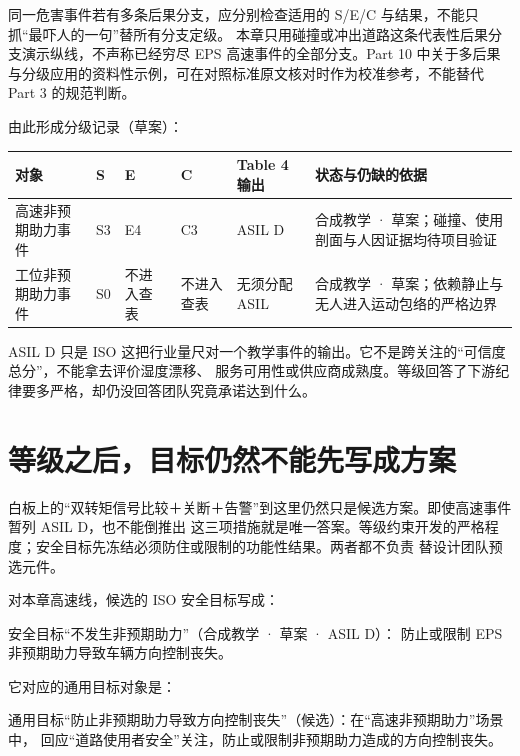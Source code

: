 同一危害事件若有多条后果分支，应分别检查适用的 S/E/C 与结果，不能只抓“最吓人的一句”替所有分支定级。
本章只用碰撞或冲出道路这条代表性后果分支演示纵线，不声称已经穷尽 EPS 高速事件的全部分支。Part 10 中关于多后果
与分级应用的资料性示例，可在对照标准原文核对时作为校准参考，不能替代 Part 3 的规范判断。

由此形成分级记录（草案）：

\begin{center}
\begingroup\small
\setlength{\tabcolsep}{4pt}
\begin{tabularx}{\linewidth}{@{}XXXXXX@{}}
\toprule
对象 & S & E & C & Table 4 输出 & 状态与仍缺的依据 \\
\midrule
高速非预期助力事件 & S3 & E4 & C3 & ASIL D & 合成教学 · 草案；碰撞、使用剖面与人因证据均待项目验证 \\
工位非预期助力事件 & S0 & 不进入查表 & 不进入查表 & 无须分配 ASIL & 合成教学 · 草案；依赖静止与无人进入运动包络的严格边界 \\
\bottomrule
\end{tabularx}
\endgroup
\end{center}

ASIL D 只是 ISO 这把行业量尺对一个教学事件的输出。它不是跨关注的“可信度总分”，不能拿去评价湿度漂移、
服务可用性或供应商成熟度。等级回答了下游纪律要多严格，却仍没回答团队究竟承诺达到什么。

\section{等级之后，目标仍然不能先写成方案}

白板上的“双转矩信号比较＋关断＋告警”到这里仍然只是候选方案。即使高速事件暂列 ASIL D，也不能倒推出
这三项措施就是唯一答案。等级约束开发的严格程度；安全目标先冻结必须防住或限制的功能性结果。两者都不负责
替设计团队预选元件。

对本章高速线，候选的 ISO 安全目标写成：

\begin{noteblock}
安全目标“不发生非预期助力”（合成教学 · 草案 · ASIL D）：
防止或限制 EPS 非预期助力导致车辆方向控制丧失。
\end{noteblock}

它对应的通用目标对象是：

\begin{noteblock}
通用目标“防止非预期助力导致方向控制丧失”（候选）：在“高速非预期助力”场景中，
回应“道路使用者安全”关注，防止或限制非预期助力造成的方向控制丧失。
\end{noteblock}

